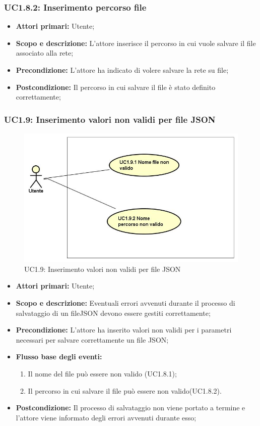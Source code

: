 \subsubsection{UC1.8.2: Inserimento percorso file} 
\begin{itemize} 
	\item{\textbf{Attori primari:} Utente;} 
	\item{\textbf{Scopo e descrizione:} L'attore inserisce il percorso in cui vuole salvare il file associato alla rete;} 
	\item{\textbf{Precondizione:} L'attore ha indicato di volere salvare la rete su file;} 
	\item{\textbf{Postcondizione:} Il percorso in cui salvare il file è stato definito correttamente;} 
\end{itemize} 
\subsubsection{UC1.9: Inserimento valori non validi per file JSON} 
\begin{figure} [H]
	\centering
	\includegraphics[scale=0.45]{Img/UC1-9} 
	\caption{UC1.9: Inserimento valori non validi per file JSON} \label{} 
\end{figure} 
\begin{itemize} 
	\item{\textbf{Attori primari:} Utente;} 
	\item{\textbf{Scopo e descrizione:} Eventuali errori avvenuti durante il processo di salvataggio di un fileJSON devono essere gestiti correttamente;} 
	\item{\textbf{Precondizione:} L'attore ha inserito valori non validi per i parametri necessari per salvare correttamente un file JSON;} 
	\item{\textbf{Flusso base degli eventi:} } 
	\begin{enumerate} 
		\item{Il nome del file può essere non valido (UC1.8.1);} 
		\item{Il percorso in cui salvare il file può essere non valido(UC1.8.2).} 
	\end{enumerate} 
	\item{\textbf{Postcondizione:} Il processo di salvataggio non viene portato a termine e l'attore viene informato degli errori avvenuti durante esso;} 
\end{itemize} 
